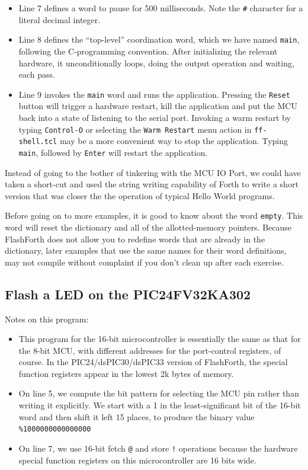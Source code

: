 \documentclass[12pt,a4paper]{article}
\newcommand{\code}[2]{
 \hrulefill
 \scriptsize
 
 \hrulefill
 \vspace{2em}
 \normalsize
}
\begin{document}
\begin{itemize}
 \item Line 7 defines a word to pause for 500 milliseconds.
  Note the \verb!#! character for a literal decimal integer.
 \item Line 8 defines the ``top-level'' coordination word, which we have named
  \verb!main!, following the C-programming convention.
  After initializing the relevant hardware, it unconditionally loops, doing the output
  operation and waiting, each pass.
 \item Line 9 invokes the \verb!main! word and runs the application.
  Pressing the \verb!Reset! button will trigger a hardware restart,
  kill the application and put the MCU back into a state of listening to the serial port.
  Invoking a warm restart by typing \verb!Control-O! or selecting the \verb!Warm Restart! 
  menu action in \verb!ff-shell.tcl! may be a more convenient way to stop the application.
  Typing \verb!main!, followed by \verb!Enter! will restart the application.
\end{itemize}

\medskip\noindent
Instead of going to the bother of tinkering with the MCU IO Port, 
we could have taken a short-cut and used the string writing capability 
of Forth to write a short version that was closer the the operation of
typical Hello World programs.

\medskip\noindent
\code{}{../src/short-hello-world.txt}

\medskip\noindent
Before going on to more examples, it is good to know about the word \verb!empty!.
This word will reset the dictionary and all of the allotted-memory pointers.
Because FlashForth does not allow you to redefine words that are already in the dictionary,
later examples that use the same names for their word definitions, 
may not compile without complaint if you don't clean up after each exercise.


\bigskip
\subsection{Flash a LED on the PIC24FV32KA302}
%

\noindent
\code{}{../pic24/flash-led.txt}

\medskip\noindent
Notes on this program:
\begin{itemize}
\item This program for the 16-bit microcontroller is essentially the same as that
  for the 8-bit MCU, with different addresses for the port-control registers, of course.
  In the PIC24/dsPIC30/dsPIC33 version of FlashForth, the special function registers appear
  in the lowest 2k bytes of memory.
\item On line 5, we compute the bit pattern for selecting the MCU pin rather than writing it explicitly.
  We start with a 1 in the least-significant bit of the 16-bit word and then shift it left 15 places,
  to produce the binary value \verb!%1000000000000000!
\item On line 7, we use 16-bit fetch \verb!@! and store \verb?!? operations because the hardware
  special function registers on this microcontroller are 16 bits wide.
\end{itemize}
\end{document}
